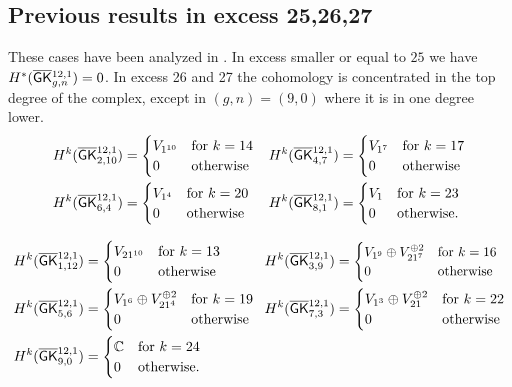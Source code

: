 \subsection{Previous results in excess 25,26,27} 
These cases have been analyzed in \cite[Section 3]{CLPW2}. In excess smaller or equal to $25$ we have $H^*(\overline{\mathsf{GK}}{}^{12,1}_{g,n}) = 0$. In excess 26 and 27 the cohomology is concentrated in the top degree of the complex, except in $(g,n)=(9,0)$ where it is in one degree lower.
\begin{align*}
    H^k(\overline{\mathsf{GK}}{}^{12,1}_{2,10}) &=
    \begin{cases}
        V_{1^{10}} & \text{for $k=14$} \\
        0 & \text{otherwise}
    \end{cases}
&
H^k(\overline{\mathsf{GK}}{}^{12,1}_{4,7}) &=
    \begin{cases}
        V_{1^{7}} & \text{for $k=17$} \\
        0 & \text{otherwise}
    \end{cases}
\\
H^k(\overline{\mathsf{GK}}{}^{12,1}_{6,4}) &=
\begin{cases}
    V_{1^{4}} & \text{for $k=20$} \\
    0 & \text{otherwise}
\end{cases}     
&
H^k(\overline{\mathsf{GK}}{}^{12,1}_{8,1}) &=
\begin{cases}
    V_1 & \text{for $k=23$} \\
    0 & \text{otherwise.}
\end{cases}  
\end{align*}

\begin{align*}
  H^k(\myB_{1,12}) &=
  \begin{cases}
      V_{21^{10}} & \text{for $k=13$} \\
      0 & \text{otherwise}
  \end{cases}
  &
  H^k(\myB_{3,9}) &=
  \scalebox{.95}{$\begin{cases}
      V_{1^{9}}\oplus V_{21^7}^{\oplus 2} & \text{for $k=16$} \\
      0 & \text{otherwise}
  \end{cases}$
  }
  \\
  H^k(\myB_{5,6}) &=
  \begin{cases}
    V_{1^{6}}\oplus V_{21^4}^{\oplus 2} & \text{for $k=19$} \!\! \\
    0 & \text{otherwise}
\end{cases}
  &
  H^k(\myB_{7,3}) &=
  \begin{cases}
    V_{1^{3}}\oplus V_{21}^{\oplus 2} & \text{for $k=22$} \\
    0 & \text{otherwise}
\end{cases}
  \\
  H^k(\myB_{9,0}) &=
  \begin{cases}
    \mathbb C & \text{for $k=24$} \\
    0 & \text{otherwise.}
  \end{cases}
\end{align*}

